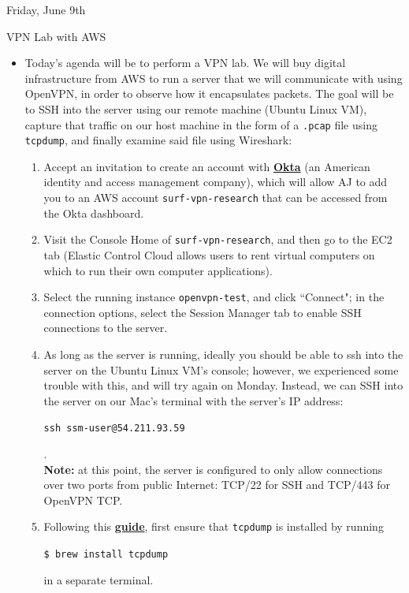 \documentclass[11pt]{article}
\newcommand\codebox[1]{
    \noindent\hspace{-0.25em}\begin{tcolorbox}[on line, hbox, colback = codeblack, colframe = codeborder, coltext = white, boxrule = 1.5pt, left = 2pt, right = 2pt, top = 0.5pt, bottom = 0.5pt]
    \small\texttt{#1}\normalsize
    \end{tcolorbox}\hspace{-0.25em}
}
\begin{document}
\normalsize\begin{orangebox}{Friday, June 9th\vspace{-2.2em}\begin{flushright}VPN Lab with AWS \end{flushright}}
    \begin{itemize}
        \item Today's agenda will be to perform a VPN lab. We will buy digital infrastructure from AWS to run a server that we will communicate with using OpenVPN, in order to observe how it encapsulates packets. The goal will be to SSH into the server using our remote machine (Ubuntu Linux VM), capture that traffic on our host machine in the form of a \texttt{.pcap} file using \texttt{tcpdump}, and finally examine said file using Wireshark:
        \begin{enumerate}
            \item Accept an invitation to create an account with \href{https://en.wikipedia.org/wiki/Okta,_Inc.}{\textbf{Okta}} (an American identity and access management company), which will allow AJ to add you to an AWS account \texttt{surf-vpn-research} that can be accessed from the Okta dashboard.
            \item Visit the Console Home of \texttt{surf-vpn-research}, and then go to the EC2 tab (Elastic Control Cloud allows users to rent virtual computers on which to run their own computer applications).
            \item Select the running instance \texttt{openvpn-test}, and click ``Connect"; in the connection options, select the Session Manager tab to enable SSH connections to the server.
            \item As long as the server is running, ideally you should be able to ssh into the server on the Ubuntu Linux VM's console; however, we experienced some trouble with this, and will try again on Monday. Instead, we can SSH into the server on our Mac's terminal with the server's IP address: \codebox{ssh ssm-user@54.211.93.59}. \\
            \textbf{Note:} at this point, the server is configured to only allow connections over two ports from public Internet: TCP/22 for SSH and TCP/443 for OpenVPN TCP.
            \item Following this \href{https://www.comparitech.com/net-admin/tcpdump-capture-wireshark/}{\textbf{guide}}, first ensure that \texttt{tcpdump} is installed by running \codebox{\$ brew install tcpdump} in a separate terminal.

\end{enumerate}
\end{itemize}
\end{orangebox}
\end{document}
